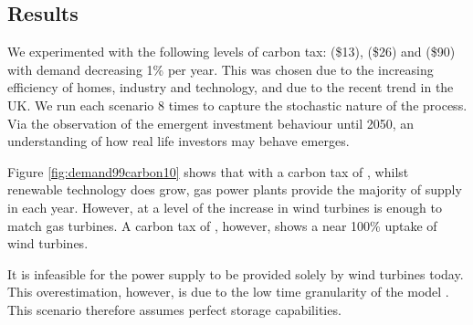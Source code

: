 \subsection{Results}


We experimented with the following levels of carbon tax:  (\$13),  (\$26) and  (\$90) with demand decreasing 1\% per year. This was chosen due to the increasing efficiency of homes, industry and technology, and due to the recent trend in the UK. We run each scenario 8 times to capture the stochastic nature of the process. Via the observation of the emergent investment behaviour until 2050, an understanding of how real life investors may behave emerges.


Figure \ref{fig:demand99carbon10} shows that with a carbon tax of , whilst renewable technology does grow, gas power plants provide the majority of supply in each year. However, at a level of  the increase in wind turbines is enough to match gas turbines. A carbon tax of , however, shows a near 100\% uptake of wind turbines.

It is infeasible for the power supply to be provided solely by wind turbines today. This overestimation, however, is due to the low time granularity of the model \cite{Collins2017}. This scenario therefore assumes perfect storage capabilities.














